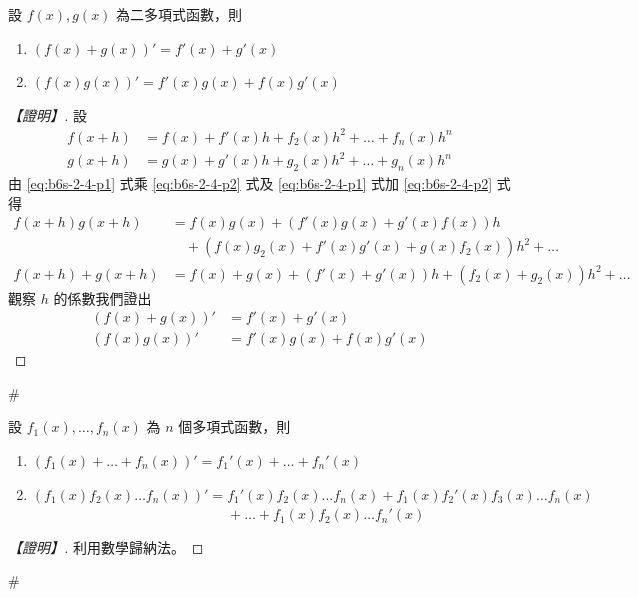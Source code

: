 \begin{theorem}\label{thm:b6s-2-diff-rules}
設 $f(x), g(x)$ 為二多項式函數，則
\begin{enumerate}[label=(\arabic*), leftmargin=2em]
  \item $(f(x)+g(x))' = f'(x) + g'(x)$
  \item $(f(x)g(x))' = f'(x)g(x) + f(x)g'(x)$
\end{enumerate}
\end{theorem}

\begin{proof}[【證明】]
設
\begin{align}
f(x+h) &= f(x) + f'(x)h + f_2(x)h^2 + \dots + f_n(x)h^n \label{eq:b6s-2-4-p1} \\
g(x+h) &= g(x) + g'(x)h + g_2(x)h^2 + \dots + g_n(x)h^n \label{eq:b6s-2-4-p2}
\end{align}
由 \eqref{eq:b6s-2-4-p1} 式乘 \eqref{eq:b6s-2-4-p2} 式及 \eqref{eq:b6s-2-4-p1} 式加 \eqref{eq:b6s-2-4-p2} 式得
\begin{align*}
f(x+h)g(x+h) &= f(x)g(x) + (f'(x)g(x) + g'(x)f(x))h \\
&\quad + (f(x)g_2(x) + f'(x)g'(x) + g(x)f_2(x))h^2 + \dots \\
f(x+h)+g(x+h) &= f(x)+g(x) + (f'(x)+g'(x))h + (f_2(x)+g_2(x))h^2 + \dots
\end{align*}
觀察 $h$ 的係數我們證出
\begin{align*}
(f(x)+g(x))' &= f'(x) + g'(x) \\
(f(x)g(x))' &= f'(x)g(x) + f(x)g'(x)
\end{align*}
\end{proof}\hfill$\#$

\begin{corollary}\label{cor:b6s-2-diff-multi}
設 $f_1(x), \dots, f_n(x)$ 為 $n$ 個多項式函數，則
\begin{enumerate}[label=(\arabic*), leftmargin=2em]
  \item $(f_1(x)+\dots+f_n(x))' = f_1'(x) + \dots + f_n'(x)$
  \item $(f_1(x)f_2(x)\dots f_n(x))' = f_1'(x)f_2(x)\dots f_n(x) + f_1(x)f_2'(x)f_3(x)\dots f_n(x)$ \\
  $\phantom{(f_1(x)f_2(x)\dots f_n(x))' ={}} + \dots + f_1(x)f_2(x)\dots f_n'(x)$
\end{enumerate}
\end{corollary}

\begin{proof}[【證明】]
利用數學歸納法。
\end{proof}\hfill$\#$

